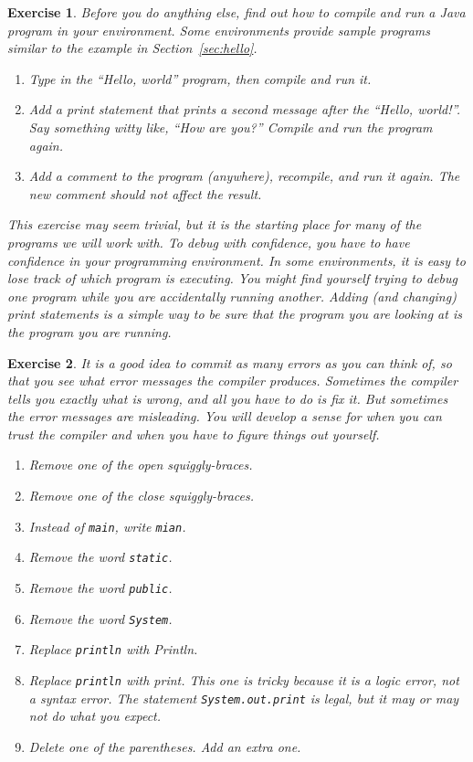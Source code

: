 \documentclass[12pt]{book}
\theoremstyle{exercise}
\newtheorem{exercise}{Exercise}[chapter]
\newcommand{\java}[1]{\lstinline{#1}} %
\begin{document}
\begin{exercise}

Before you do anything else, find out how to compile and run a Java program in your environment.
Some environments provide sample programs similar to the example in Section~\ref{sec:hello}.

\begin{enumerate}
\item Type in the ``Hello, world'' program, then compile and run it.

\item Add a print statement that prints a second message after the ``Hello, world!''.
Say something witty like, ``How are you?''
Compile and run the program again.

\item Add a comment to the program (anywhere), recompile, and run it again.
The new comment should not affect the result.
\end{enumerate}

This exercise may seem trivial, but it is the starting place for many of the programs we will work with.
To debug with confidence, you have to have confidence in your programming environment.
In some environments, it is easy to lose track of which program is executing.
You might find yourself trying to debug one program while you are accidentally running another.
Adding (and changing) print statements is a simple way to be sure that the program you are looking at is the program you are running.

\end{exercise}

\begin{exercise}

It is a good idea to commit as many errors as you can think of, so that you see what error messages the compiler produces.
Sometimes the compiler tells you exactly what is wrong, and all you have to do is fix it.
But sometimes the error messages are misleading.
You will develop a sense for when you can trust the compiler and when you have to figure things out yourself.

\begin {enumerate}
\item Remove one of the open squiggly-braces.
\item Remove one of the close squiggly-braces.
\item Instead of \java{main}, write \java{mian}.
\item Remove the word \java{static}.
\item Remove the word \java{public}.
\item Remove the word \java{System}.
\item Replace \java{println} with {Println}.
\item Replace \java{println} with {print}.
This one is tricky because it is a logic error, not a syntax error.
The statement \java{System.out.print} is legal, but it may or may not do what you expect.
\item Delete one of the parentheses.  Add an extra one.
\end {enumerate}

\end{exercise}
\end{document}
